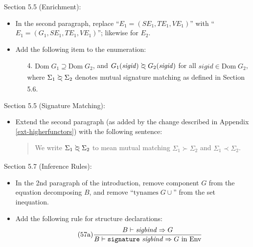 \documentclass[twoside,titlepage]{article}
\begin{document}
\begin{appendix}
Section 5.5 (Enrichment):
\begin{itemize}
\item In the second paragraph, replace ``$E_1 = (\mathit{SE}_1,\mathit{TE}_1,\mathit{VE}_1)$'' with ``$E_1 = (G_1,\mathit{SE}_1,\mathit{TE}_1,\mathit{VE}_1)$''; likewise for $E_2$.

\item Add the following item to the enumeration:
  \begin{enumerate}
  \item[4.] $\mbox{Dom}\;G_1 \supseteq \mbox{Dom}\;G_2$, and $G_1(\mathit{sigid}) \;\begin{array}{@{}c@{}}\succ\\[-8pt] \prec\end{array}\; G_2(\mathit{sigid})$ for all $\mathit{sigid} \in \mbox{Dom}\;G_2$, where $\Sigma_1 \;\begin{array}{@{}c@{}}\succ\\[-8pt] \prec\end{array}\; \Sigma_2$ denotes mutual signature matching as defined in Section 5.6.
  \end{enumerate}
\end{itemize}

Section 5.5 (Signature Matching):
\begin{itemize}
\item Extend the second paragraph (as added by the change described in Appendix \ref{ext-higherfunctors}) with the following sentence:
  \begin{quote}
  We write $\Sigma_1 \;\begin{array}{@{}c@{}}\succ\\[-8pt] \prec\end{array}\; \Sigma_2$ to mean mutual matching $\Sigma_1 \succ \Sigma_2$ and $\Sigma_1 \prec \Sigma_2$.
  \end{quote}
\end{itemize}

Section 5.7 (Inference Rules):
\begin{itemize}
\item In the 2nd paragraph of the introduction, remove component $G$ from the equation decomposing $B$, and remove ``$\mbox{tynames}\;G \cup$'' from the set inequation.

\item Add the following rule for structure declarations:
  \begin{equation}
  \tag{57a}
  \frac{
  B \vdash \mathit{sigbind} \Rightarrow G
  }{
  B \vdash {\tt{signature}}~\mathit{sigbind} \Rightarrow \mbox{$G$ in Env}
  }
  \end{equation}


\end{itemize}
\end{appendix}
\end{document}
